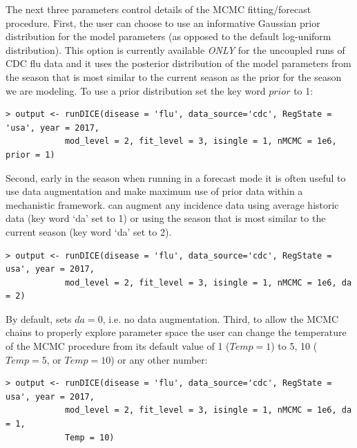 \documentclass[a4paper]{article}
\begin{document}
The next three parameters control details of the MCMC fitting/forecast procedure.  First, the user can choose to use an informative Gaussian prior distribution for the model parameters (as opposed to the default log-uniform distribution). This option is currently available \emph{ONLY} for the uncoupled runs of CDC flu data and it uses the posterior distribution of the model parameters from the season that is most similar to the current season as the prior for the season we are modeling.
To use a prior distribution set the key word $prior$ to 1:

\begin{verbatim}
> output <- runDICE(disease = 'flu', data_source='cdc', RegState = 'usa', year = 2017,
            mod_level = 2, fit_level = 3, isingle = 1, nMCMC = 1e6, prior = 1)
\end{verbatim}

Second, early in the season when running in a forecast mode it is often useful to use data augmentation and make maximum use of prior data within a mechanistic framework.  can augment any incidence data using average historic data (key word `da' set to 1) or using the season that is most similar to the current season (key word `da' set to 2).

\begin{verbatim}
> output <- runDICE(disease = 'flu', data_source='cdc', RegState = usa', year = 2017,
            mod_level = 2, fit_level = 3, isingle = 1, nMCMC = 1e6, da = 2)
\end{verbatim}

By default,  sets $da =0$, i.e. no data augmentation.
Third, to allow the MCMC chains to properly explore parameter space the user can change the temperature of the MCMC procedure from its default value of 1 ($Temp = 1$) to 5, 10 ($Temp = 5$, or $Temp =10$) or any other number:

\begin{verbatim}
> output <- runDICE(disease = 'flu', data_source='cdc', RegState = usa', year = 2017,
            mod_level = 2, fit_level = 3, isingle = 1, nMCMC = 1e6, da = 1,
            Temp = 10)
\end{verbatim}
\end{document}
